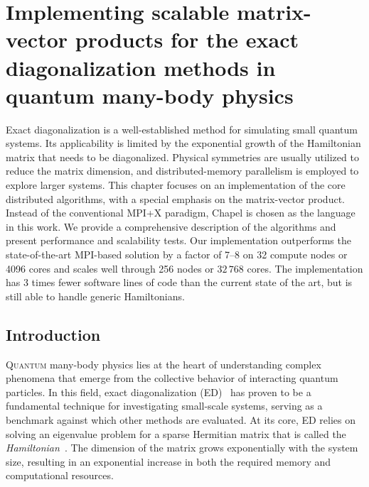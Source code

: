 \openleft
\chapter[Implementing scalable matrix-vector products for the exact diagonalization methods in quantum many-body physics][Scalable matrix-vector products for exact diagonalization]{Implementing scalable matrix-vector products for the exact diagonalization methods in quantum many-body physics}\label{ch:paw-atm}

{\small Exact diagonalization is a well-established method for simulating small quantum systems. Its applicability is limited by the exponential growth of the Hamiltonian matrix that needs to be diagonalized. Physical symmetries are usually utilized to reduce the matrix dimension, and distributed-memory parallelism is employed to explore larger systems. This chapter focuses on an implementation of the core distributed algorithms, with a special emphasis on the matrix-vector product. Instead of the conventional MPI+X paradigm, Chapel is chosen as the language in this work. We provide a comprehensive description of the algorithms and present performance and scalability tests. Our implementation outperforms the state-of-the-art MPI-based solution by a factor of 7--8 on 32 compute nodes or 4096 cores and scales well through 256 nodes or $32\,768$ cores. The implementation has 3 times fewer software lines of code than the current state of the art, but is still able to handle generic Hamiltonians.}
 
\clearpage

\section{Introduction}

\lettrine[lines=2]{Q}{uantum} many-body physics lies at the heart of understanding complex phenomena that emerge from the collective behavior of interacting quantum particles. In this field, exact diagonalization (ED)~\cite{LinH1990ExactDiagonali} has proven to be a fundamental technique for investigating small-scale systems, serving as a benchmark against which other methods are evaluated. At its core, ED relies on solving an eigenvalue problem for a sparse Hermitian matrix that is called the \emph{Hamiltonian}~\cite{Griffi2018IntroductionTo}. The dimension of the matrix grows exponentially with the system size, resulting in an exponential increase in both the required memory and computational resources.

